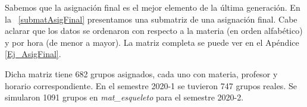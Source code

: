 
%

Sabemos que la asignación final es el mejor elemento de la última generación. En la \tablename{~\ref{submatAsigFinal}} presentamos una submatriz de una asignación final. Cabe aclarar que los datos se ordenaron con respecto a la materia (en orden alfabético) y por hora (de menor a mayor). La matriz completa se puede ver en el Apéndice \ref{Ej_AsigFinal}.

Dicha matriz tiene 682 grupos asignados, cada uno con materia, profesor y horario correspondiente. En el semestre 2020-1 se tuvieron 747 grupos reales. Se simularon 1091 grupos en \textit{mat\_esqueleto} para el semestre 2020-2.

